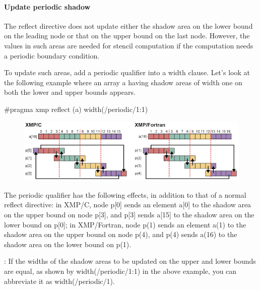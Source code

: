 \paragraph{Update periodic shadow}

The reflect directive does not update either the shadow area on the
lower bound on the leading node or that on the upper bound on the last
node. However, the values in such areas are needed for stencil
computation if the computation needs a periodic boundary condition.

To update such areas, add a periodic qualifier into a width
clause. Let’s look at the following example where an array a having
shadow areas of width one on both the lower and upper bounds appears.

\begin{XCexample}
#pragma xmp reflect (a) width(/periodic/1:1)
\end{XCexample}


\begin{figure}
  \centering
  \includegraphics{figs/reflect_periodic.png}
\end{figure}

The periodic qualifier has the following effects, in addition to that of
a normal reflect directive: in XMP/C, node p[0] sends an element a[0] to
the shadow area on the upper bound on node p[3], and p[3] sends a[15] to
the shadow area on the lower bound on p[0]; in XMP/Fortran, node p(1)
sends an element a(1) to the shadow area on the upper bound on node
p(4), and p(4) sends a(16) to the shadow area on the lower bound on
p(1).

\noindent\hrulefill

: If the widths of the shadow areas to be updated on
the upper and lower 
bounds are equal, as shown by width(/periodic/1:1) in the above example,
you can abbreviate it as width(/periodic/1).

\noindent\hrulefill

